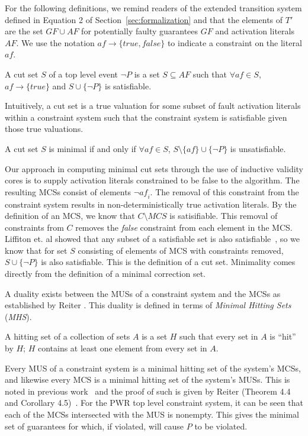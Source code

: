 For the following definitions, we remind readers of the extended transition system defined in Equation 2 of Section~\ref{sec:formalization} and that the elements of $T'$ are the set $\mathit{GF} \cup \mathit{AF}$ for potentially faulty guarantees $\mathit{GF}$ and activation literals $\mathit{AF}$. We use the notation $\mathit{af} \rightarrow \{\mathit{true}, \mathit{false}\}$ to indicate a constraint on the literal $\mathit{af}$. 

\begin{definition}
A cut set $S$ of a top level event $\neg P$ is a set $S \subseteq \mathit{AF}$ such that $\forall \mathit{af} \in S$, $\mathit{af} \rightarrow \{\mathit{true}\}$ and $S \cup \{\neg P\}$ is satisfiable.
\end{definition}

Intuitively, a cut set is a true valuation for some subset of fault activation literals within a constraint system such that the constraint system is satisfiable given those true valuations.

\begin{definition}
A cut set $S$ is minimal if and only if $\forall \mathit{af} \in S$, $S \setminus \{\mathit{af}\} \cup \{\neg P\}$ is unsatisfiable.
\end{definition}

Our approach in computing minimal cut sets through the use of inductive validity cores is to supply activation literals constrained to be false to the algorithm. The resulting MCSs consist of elements $\neg \mathit{af}_i$. The removal of this constraint from the constraint system results in non-deterministically true activation literals. By the definition of an MCS, we know that $C \setminus \mathit{MCS}$ is satisifiable. This removal of constraints from $C$ removes the {\em false} constraint from each element in the MCS. Liffiton et. al showed that any subset of a satisfiable set is also satisfiable~\cite{liffiton2016fast}, so we know that for set $S$ consisting of elements of MCS with constraints removed, $S \cup \{\neg P\}$ is also satisfiable. This is the definition of a cut set. Minimality comes directly from the definition of a minimal correction set. 

A duality exists between the MUSs of a constraint system and the MCSs as established by Reiter \cite{reiter1987theory}. This duality is defined in terms of \textit{Minimal Hitting Sets} (\textit{MHS}). 
\begin{definition}
A hitting set of a collection of sets $A$ is a set $H$ such that every set in $A$ is ``hit'' by $H$; $H$ contains at least one element from every set in $A$. 
\end{definition}
Every MUS of a constraint system is a minimal hitting set of the system's MCSs, and likewise every MCS is a minimal hitting set of the system's MUSs. This is noted in previous work~\cite{liffiton2016fast, de1987diagnosing} and the proof of such is given by Reiter (Theorem 4.4 and Corollary 4.5)~\cite{reiter1987theory}. For the PWR top level constraint system, it can be seen that each of the MCSs intersected with the MUS is nonempty. This gives the minimal set of guarantees for which, if violated, will cause $P$ to be violated. 

